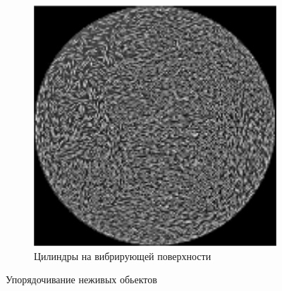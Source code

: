 \begin{figure}
\begin{subfigure}[t]{.4\columnwidth}
                \includegraphics[width=\columnwidth]{Images/Fig6_CollectiveMotion}
                \caption{Цилиндры на вибрирующей поверхности~\cite{blair2003}}
                \label{fig:CollMot:rods}
        \end{subfigure}
        \caption{Упорядочивание неживых обьектов}
        \label{fig:CollMot:NonLiving}
    \end{figure}
